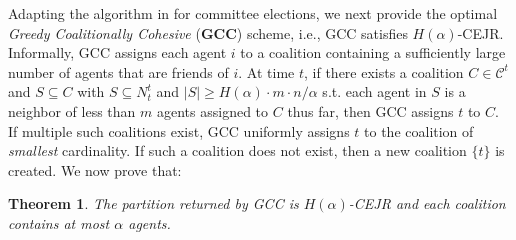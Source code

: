 \documentclass[letterpaper]{article}
\newtheorem{theorem}{Theorem}
\begin{document}
Adapting the algorithm in \cite[Section 5.2]{do2022online} for committee elections, we next provide the optimal \textit{Greedy Coalitionally Cohesive} (\textbf{GCC}) scheme, i.e., GCC satisfies $H(\alpha)$-CEJR. Informally, GCC assigns each agent $i$ to a coalition containing a sufficiently large number of agents that are friends of $i$. At time $t$, if there exists a coalition $C \in \mathcal{C}^t$ and $S \subseteq C$ with $S \subseteq N_t^t$ and $|S| \geq H(\alpha) \cdot m \cdot n/\alpha$ s.t. each agent in $S$ is a neighbor of less than $m$ agents assigned to $C$ thus far, then GCC assigns $t$ to $C$. If multiple such coalitions exist, GCC uniformly assigns $t$ to the coalition of \textit{smallest} cardinality. If such a coalition does not exist, then a new coalition $\{t\}$ is created. We now prove that:  \begin{theorem}
\label{thm:gcc}
The partition returned by GCC is $H(\alpha)$-CEJR and each coalition contains at most $\alpha$ agents.
\end{theorem}
\end{document}
